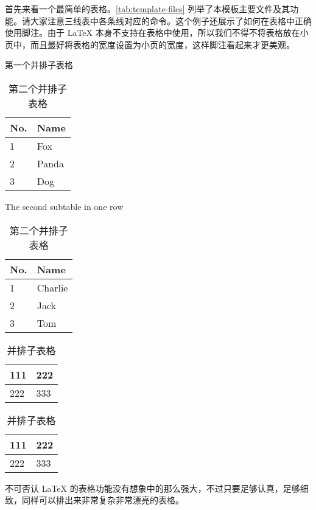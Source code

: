 首先来看一个最简单的表格。\ref{tab:template-files} 列举了本模板主要文件及其功能。请大家注意三线表中各条线对应的命令。这个例子还展示了如何在表格中正确使用脚注。由于 \LaTeX{} 本身不支持在表格中使用，所以我们不得不将表格放在小页中，而且最好将表格的宽度设置为小页的宽度，这样脚注看起来才更美观。

\begin{table}[htbp]
	\noindent\begin{minipage}{0.5\textwidth}
		\centering
		\caption{第一个并排子表格}
		\label{tab:parallel1}
		\begin{tabular}{p{2cm}p{2cm}}
					\toprule
					No. & Name \\\midrule
					1 & Fox \\
					2 & Panda \\
					3 & Dog \\
					\bottomrule
		\end{tabular}
	\end{minipage}%
	\begin{minipage}{0.5\textwidth}
		\centering
		\caption{第二个并排子表格}{The second subtable in one row}
		\label{tab:parallel2}
		\begin{tabular}{p{2cm}p{2cm}}
			\toprule
			No. & Name \\\midrule
			1 & Charlie \\
			2 & Jack \\
			3 & Tom \\
			\bottomrule
		\end{tabular}
	\end{minipage}
\end{table}

\begin{table}[htbp]
	\centering
	\caption{并排子表格}
	\label{tab:subtable}

	{
		\begin{tabular}{p{2cm}p{2cm}}
			\toprule
			111 & 222 \\\midrule
			222 & 333 \\\bottomrule
		\end{tabular}
	}
	\hskip2cm

	{
		\begin{tabular}{p{2cm}p{2cm}}
			\toprule
			111 & 222 \\\midrule
			222 & 333 \\\bottomrule
		\end{tabular}
	}
\end{table}

不可否认 \LaTeX{} 的表格功能没有想象中的那么强大，不过只要足够认真，足够细致，同样可以排出来非常复杂非常漂亮的表格。

